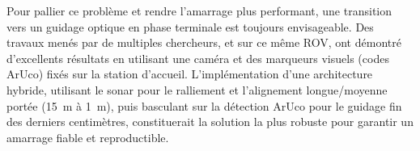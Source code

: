 Pour pallier ce problème et rendre l'amarrage plus performant, une transition vers un guidage optique en phase terminale est toujours envisageable. Des travaux menés par de multiples chercheurs, et sur ce même ROV, ont démontré d'excellents résultats en utilisant une caméra et des marqueurs visuels (codes ArUco) fixés sur la station d'accueil. L'implémentation d'une architecture hybride, utilisant le sonar pour le ralliement et l'alignement longue/moyenne portée (15~m à 1~m), puis basculant sur la détection ArUco pour le guidage fin des derniers centimètres, constituerait la solution la plus robuste pour garantir un amarrage fiable et reproductible.